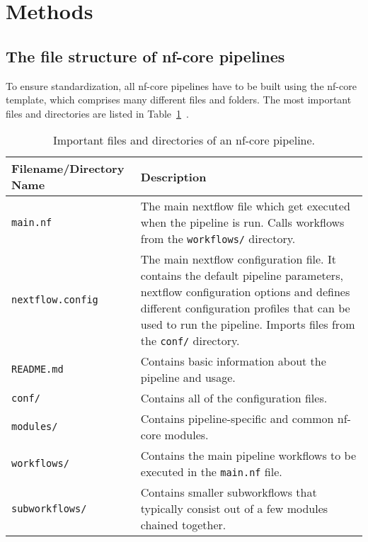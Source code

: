 \documentclass{article}
\theoremstyle{plain}
\theoremstyle{definition}
\theoremstyle{remark}
\begin{document}
\section{Methods}
\subsection{The file structure of nf-core pipelines}
To ensure standardization, all nf-core pipelines have to be built using the nf-core template, which comprises many different files and folders. The most important files and directories are listed in Table~\ref{nfcorefiles}~\cite{nfcorefs}.
\begin{table}[h]
    \centering
    \caption{Important files and directories of an nf-core pipeline.}
    \begin{tabular}{@{}lp{12cm}@{}}
        \toprule
        \textbf{Filename/Directory Name} & \textbf{Description} \\ \midrule
        \verb|main.nf| & The main nextflow file which get executed when the pipeline is run. Calls workflows from the \verb|workflows/| directory. \\
        \verb|nextflow.config| & The main nextflow configuration file. It contains the default pipeline parameters, nextflow configuration options and defines different configuration profiles that can be used to run the pipeline. Imports files from the \verb|conf/| directory. \\
        \verb|README.md| & Contains basic information about the pipeline and usage. \\
        \verb|conf/| & Contains all of the configuration files. \\
        \verb|modules/| & Contains pipeline-specific and common nf-core modules. \\
        \verb|workflows/| & Contains the main pipeline workflows to be executed in the \verb|main.nf| file. \\
        \verb|subworkflows/| & Contains smaller subworkflows that typically consist out of a few modules chained together. \\ \bottomrule
    \end{tabular}
    \label{nfcorefiles}
\end{table}
\end{document}
